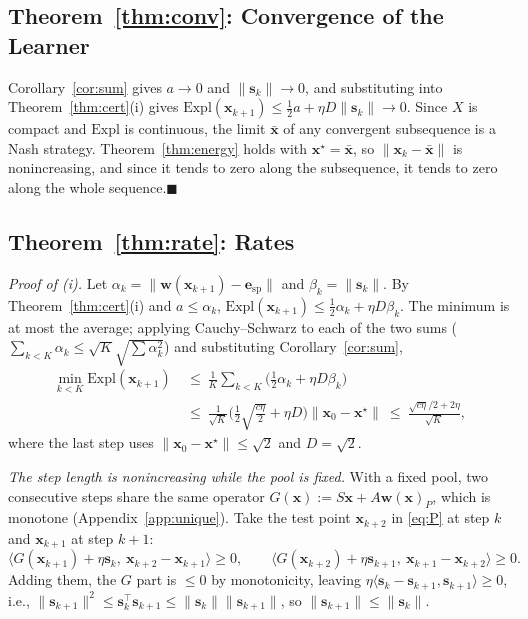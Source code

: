 \documentclass{article} %
\theoremstyle{plain}
\theoremstyle{remark}
\newcommand{\Expl}{\mathrm{Expl}}
\newcommand{\bx}{{\bm{x}}}
\newcommand{\bw}{{\bm{w}}}
\newcommand{\be}{{\bm{e}}}
\newcommand{\xs}{\bx^{\star}}
\newcommand{\dx}{{\bm{s}}}
\newcommand{\esp}{\be_{\mathrm{sp}}}
\begin{document}
\subsection{Theorem~\ref{thm:conv}: Convergence of the Learner}
\label{app:conv}

Corollary~\ref{cor:sum} gives $a\to0$ and $\|\dx_k\|\to0$, and substituting into Theorem~\ref{thm:cert}(i) gives $\Expl(\bx_{k+1})\le\tfrac12a+\eta D\|\dx_k\|\to0$. Since $X$ is compact and $\Expl$ is continuous, the limit $\bar \bx$ of any convergent subsequence is a Nash strategy. Theorem~\ref{thm:energy} holds with $\xs=\bar \bx$, so $\|\bx_k-\bar \bx\|$ is nonincreasing, and since it tends to zero along the subsequence, it tends to zero along the whole sequence.\hfill$\blacksquare$

\subsection{Theorem~\ref{thm:rate}: Rates}
\label{app:rate}

\textit{Proof of (i).} Let $\alpha_k=\|\bw(\bx_{k+1})-\esp\|$ and $\beta_k=\|\dx_k\|$. By Theorem~\ref{thm:cert}(i) and $a\le\alpha_k$, $\Expl(\bx_{k+1})\le\tfrac12\alpha_k+\eta D\beta_k$. The minimum is at most the average; applying Cauchy--Schwarz to each of the two sums ($\sum_{k<K}\alpha_k\le\sqrt K\sqrt{\sum\alpha_k^2}$) and substituting Corollary~\ref{cor:sum},
\begin{align*}
\min_{k<K}\Expl(\bx_{k+1})\ &\le\ \frac1K\sum_{k<K}\Big(\tfrac12\alpha_k+\eta D\beta_k\Big)\\
&\le\ \frac{1}{\sqrt K}\Big(\tfrac12\sqrt{\tfrac{c\eta}{2}}+\eta D\Big)\|\bx_0-\xs\|\ \le\ \frac{\sqrt{c\eta}/2+2\eta}{\sqrt K},
\end{align*}
where the last step uses $\|\bx_0-\xs\|\le\sqrt2$ and $D=\sqrt2$.

\textit{The step length is nonincreasing while the pool is fixed.} With a fixed pool, two consecutive steps share the same operator $G(\bx):=S\bx+A\bw(\bx)_P$, which is monotone (Appendix~\ref{app:unique}). Take the test point $\bx_{k+2}$ in \eqref{eq:P} at step $k$ and $\bx_{k+1}$ at step $k+1$:
\[
\langle G(\bx_{k+1})+\eta\dx_k,\ \bx_{k+2}-\bx_{k+1}\rangle\ge0,\qquad\langle G(\bx_{k+2})+\eta\dx_{k+1},\ \bx_{k+1}-\bx_{k+2}\rangle\ge0 .
\]
Adding them, the $G$ part is $\le0$ by monotonicity, leaving $\eta\langle\dx_k-\dx_{k+1},\dx_{k+1}\rangle\ge0$, i.e., $\|\dx_{k+1}\|^2\le\dx_k^\top\dx_{k+1}\le\|\dx_k\|\|\dx_{k+1}\|$, so $\|\dx_{k+1}\|\le\|\dx_k\|$.
\end{document}
